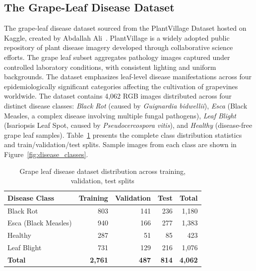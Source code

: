 \subsection{The Grape-Leaf Disease Dataset}
\vspace{-2mm}
The grape-leaf disease dataset sourced from the PlantVillage Dataset hosted on Kaggle, created by Abdallah Ali~\cite{plantvillage_dataset_2023}. PlantVillage is a widely 
adopted public repository of plant disease imagery developed through collaborative science efforts. The grape leaf subset aggregates pathology images captured under controlled laboratory conditions, with consistent lighting and uniform backgrounds. The dataset emphasizes leaf-level disease manifestations across four epidemiologically significant categories affecting the cultivation of grapevines worldwide. The dataset contains 4,062 RGB images distributed across four distinct disease classes: \textit{Black Rot} (caused by \textit{Guignardia bidwellii}), \textit{Esca} (Black Measles, a complex disease involving multiple fungal pathogens), \textit{Leaf Blight} (Isariopsis Leaf Spot, caused by \textit{Pseudocercospora vitis}), and \textit{Healthy} (disease-free grape leaf samples). Table~\ref{tab:classification_dataset_distribution} presents the complete class distribution statistics and train/validation/test splits. Sample images from each class are shown in Figure~\ref{fig:disease_classes}.



\begin{table}[htbp]
\centering
\caption{Grape leaf disease dataset distribution across training, validation, test splits}
\label{tab:classification_dataset_distribution}
\begin{tabular}{lrrrr}
\toprule
\textbf{Disease Class} & \textbf{Training} & \textbf{Validation} & \textbf{Test} & \textbf{Total} \\
\midrule
Black Rot              & 803               & 141                 & 236           & 1,180          \\
Esca (Black Measles)   & 940               & 166                 & 277           & 1,383          \\
Healthy                & 287               & 51                  & 85            & 423            \\
Leaf Blight            & 731               & 129                 & 216           & 1,076          \\
\midrule
\textbf{Total}         & \textbf{2,761}    & \textbf{487}        & \textbf{814}  & \textbf{4,062} \\
\bottomrule
\end{tabular}
\end{table}


